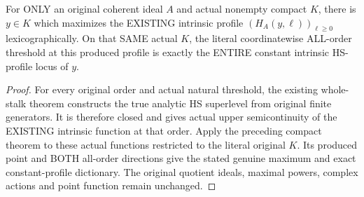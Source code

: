 \begin{theorem}
\label{hir:actual-original-compact-intrinsic-hs-lexicographic-maximum}
\leanok
For ONLY an original coherent ideal $A$ and actual nonempty compact $K$,
there is $y\in K$ which maximizes the EXISTING intrinsic profile
$(H_A(y,\ell))_{\ell\ge0}$ lexicographically. On that SAME actual $K$,
the literal coordinatewise ALL-order threshold at this produced profile
is exactly the ENTIRE constant intrinsic HS-profile locus of $y$.
\end{theorem}
\begin{proof}
For every original order and actual natural threshold, the existing
whole-stalk theorem constructs the true analytic HS superlevel from
original finite generators. It is therefore closed and gives actual
upper semicontinuity of the EXISTING intrinsic function at that order.
Apply the preceding compact theorem to these actual functions restricted
to the literal original $K$. Its produced point and BOTH all-order
directions give the stated genuine maximum and exact constant-profile
dictionary. The original quotient ideals, maximal powers, complex
actions and point function remain unchanged.
\end{proof}

